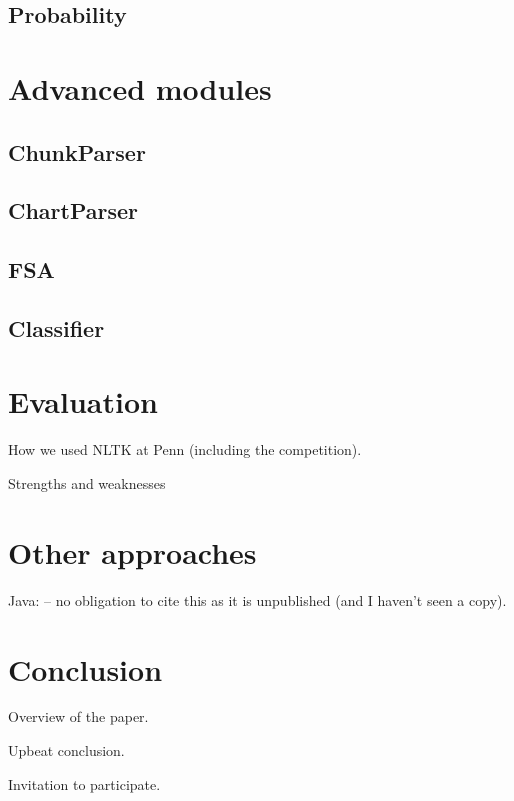 \documentclass[11pt]{article}
\begin{document}
\subsection{Probability}

\section{Advanced modules}

\subsection{ChunkParser}

\subsection{ChartParser}

\subsection{FSA}

\subsection{Classifier}


\section{Evaluation}

How we used NLTK at Penn (including the competition).

Strengths and weaknesses

\section{Other approaches}

Java: \cite{Hammond02}
-- no obligation to cite this as it is unpublished
(and I haven't seen a copy).

\section{Conclusion}

Overview of the paper.

Upbeat conclusion.

Invitation to participate.



\end{document}
